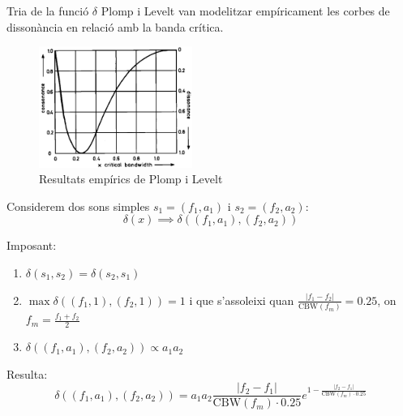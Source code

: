 \documentclass[10pt,hyperref={colorlinks,linkcolor=black,citecolor=blue!80,urlcolor=blue!60},handout]{beamer} %
\theoremstyle{definition}
\newcommand{\0}{\ensuremath{\vb{0}}}
\begin{document}
\begin{frame}{Tria de la funció $\delta$}
    Plomp i Levelt \cite{plomp} van modelitzar empíricament les corbes de dissonància en relació amb la banda crítica.
    \begin{figure}
        \centering
        \includegraphics[width=5cm,angle=-0.1]{Imatges_beamer3/plompt-levelt.png}
        \caption{Resultats empírics de Plomp i Levelt \cite{plomp}}
    \end{figure}
    \hypersetup{citecolor=black!30}
    \hypersetup{citecolor=blue!80}
\end{frame}
\begin{frame}{}
    Considerem dos sons simples $s_1=(f_1,a_1)$ i $s_2=(f_2,a_2)$:\pause
    $$\delta(x)\implies\delta((f_1,a_1),(f_2,a_2))$$\par\pause\vspace{-0.1cm}
    Imposant:
    \begin{enumerate}
        \item $\delta(s_1,s_2)=\delta(s_2,s_1)$\pause
        \item $\max\delta((f_1,1),(f_2,1))=1$ i que s'assoleixi quan $\frac{|f_1-f_2|}{\text{CBW}(f_m)}=0.25$, on $f_m=\frac{f_1+f_2}{2}$\pause
        \item $\delta((f_1,a_1),(f_2,a_2))\propto a_1a_2$\pause
    \end{enumerate}
    Resulta:
    \begin{equation*}
        \delta((f_1,a_1),(f_2,a_2))=a_1a_2\frac{|f_2-f_1|}{\text{CBW}(f_m)\cdot 0.25}e^{1-\frac{|f_2-f_1|}{\text{CBW}(f_m)\cdot 0.25}}
    \end{equation*}\vspace{-0.2cm}
    \begin{figure}
        \centering
        
    \end{figure}
\end{frame}
\end{document}
